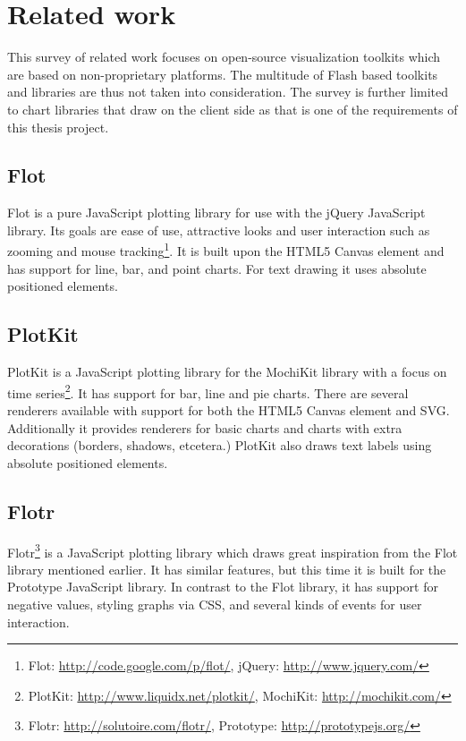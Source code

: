 \chapter{Related work}
This survey of related work focuses on open-source visualization toolkits which are based on non-proprietary platforms. The multitude of Flash based toolkits and libraries are thus not taken into consideration. The survey is further limited to chart libraries that draw on the client side as that is one of the requirements of this thesis project.

\section{Flot}
Flot is a pure JavaScript plotting library for use with the jQuery JavaScript library. Its goals are ease of use, attractive looks and user interaction such as zooming and mouse tracking\footnote{Flot: \url{http://code.google.com/p/flot/}, jQuery: \url{http://www.jquery.com/}}. It is built upon the HTML5 Canvas element and has support for line, bar, and point charts. For text drawing it uses absolute positioned  elements. 

\section{PlotKit}
PlotKit is a JavaScript plotting library for the MochiKit library with a focus on time series\footnote{PlotKit: \url{http://www.liquidx.net/plotkit/}, MochiKit: \url{http://mochikit.com/}}. It has support for bar, line and pie charts. There are several renderers available with support for both the HTML5 Canvas element and SVG. Additionally it provides renderers for basic charts and charts with extra decorations (borders, shadows, etcetera.) PlotKit also draws text labels using absolute positioned  elements.

\section{Flotr}
Flotr\footnote{Flotr: \url{http://solutoire.com/flotr/}, Prototype: \url{http://prototypejs.org/}} is a JavaScript plotting library which draws great inspiration from the Flot library mentioned earlier. It has similar features, but this time it is built for the Prototype JavaScript library. In contrast to the Flot library, it has support for negative values, styling graphs via CSS, and several kinds of events for user interaction.

